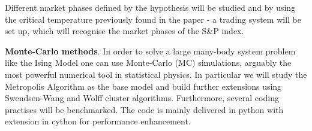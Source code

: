 Different market phases defined by the hypothesis will be studied and by using the critical temperature previously found in the paper - a trading system will be set up, which will recognise the market phases of the S\&P index.


\textbf{Monte-Carlo methods}. In order to solve a large many-body system problem like the Ising Model one can use Monte-Carlo (MC) simulations, arguably the most powerful numerical tool in statistical physics. In particular we will study the Metropolis Algorithm as the base model and build further extensions using Swendsen-Wang and Wolff cluster algorithms. Furthermore, several coding practises will be benchmarked. The code is mainly delivered in python with extension in cython for performance enhancement.

